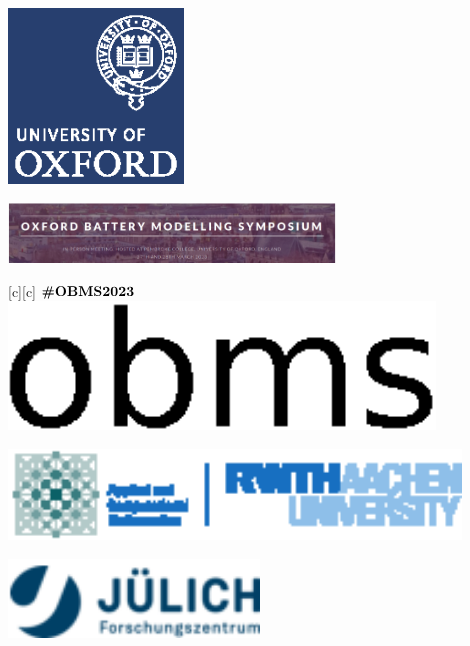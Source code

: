 \documentclass[25pt, a0paper,
portrait,
margin=2mm, 
innermargin=2mm, 
blockverticalspace=7mm, %
colspace=2mm, %
subcolspace=0mm]{tikzposter}
\begin{document}
{	\begin{minipage}{0.1\textwidth}
		\begin{flushright}
			\includegraphics[width=0.35\textwidth]{./floats/logos/oxford_blue_square.eps}
		\end{flushright}
	\end{minipage}
	\hfill
	\begin{minipage}{0.3\textwidth}
		\begin{flushleft}
			\includegraphics[width=0.65\textwidth]{./floats/logos/obms23.eps}
		\end{flushleft}
	\end{minipage}
	\hfill
	\begin{minipage}{0.05\textwidth}
		 {$\textbf{\#OBMS2023}\hphantom{aaaaaaaaaa}$}
		\includegraphics[width=0.85\textwidth]{./floats/logos/obms23_hashtag.eps}
	\end{minipage}
	\hfill
	\begin{minipage}{0.2\textwidth}
		\begin{flushright}
			\includegraphics[width=0.9\textwidth]{./floats/logos/acomrwth.eps}
		\end{flushright}
	\end{minipage}
	\hfill
	\begin{minipage}{0.2\textwidth}
		\begin{flushleft}
			\includegraphics[width=0.5\textwidth]{./floats/logos/fzj.eps}
		\end{flushleft}
	\end{minipage}
}
\end{document}
